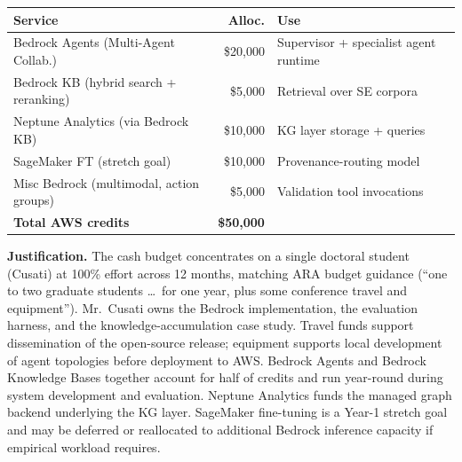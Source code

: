 \documentclass[11pt]{proposalnsf}
\begin{document}
\begin{table}[h]
\centering
\footnotesize
\begin{tabular}{p{2.6in} r p{2.0in}}
\toprule
\textbf{Service} & \textbf{Alloc.} & \textbf{Use} \\
\midrule
Bedrock Agents (Multi-Agent Collab.) & \$20,000 & Supervisor + specialist agent runtime \\
Bedrock KB (hybrid search + reranking) & \$5,000 & Retrieval over SE corpora \\
Neptune Analytics (via Bedrock KB) & \$10,000 & KG layer storage + queries \\
SageMaker FT (stretch goal) & \$10,000 & Provenance-routing model \\
Misc Bedrock (multimodal, action groups) & \$5,000 & Validation tool invocations \\
\midrule
\textbf{Total AWS credits} & \textbf{\$50,000} & \\
\bottomrule
\end{tabular}
\end{table}

\vspace{-0.4em}

\textbf{Justification.} The cash budget concentrates on a single doctoral student (Cusati) at 100\% effort across 12 months, matching ARA budget guidance (``one to two graduate students \dots\ for one year, plus some conference travel and equipment''). Mr.~Cusati owns the Bedrock implementation, the evaluation harness, and the knowledge-accumulation case study. Travel funds support dissemination of the open-source release; equipment supports local development of agent topologies before deployment to AWS. Bedrock Agents and Bedrock Knowledge Bases together account for half of credits and run year-round during system development and evaluation. Neptune Analytics funds the managed graph backend underlying the KG layer. SageMaker fine-tuning is a Year-1 stretch goal and may be deferred or reallocated to additional Bedrock inference capacity if empirical workload requires.



\end{document}
